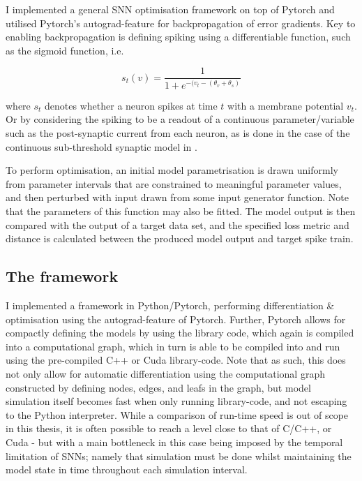 \documentclass[mphil,deptreport,ianc]{infthesis} %
\begin{document}
I implemented a general SNN optimisation framework on top of Pytorch \cite{Paszke2017} and utilised Pytorch's autograd-feature for backpropagation of error gradients.
Key to enabling backpropagation is defining spiking using a differentiable function, such as the sigmoid function, i.e.

\begin{equation}
    s_t(v) = \frac{1}{1+e^{-(v_t-(\theta_v + \theta_s)}}
\end{equation}

where $s_t$ denotes whether a neuron spikes at time $t$ with a membrane potential $v_t$. Or by considering the spiking to be a readout of a continuous parameter/variable such as the post-synaptic current from each neuron, as is done in the case of the continuous sub-threshold synaptic model in \cite{Huh2017}.

To perform optimisation, an initial model parametrisation is drawn uniformly from parameter intervals that are constrained to meaningful parameter values, and then perturbed with input drawn from some input generator function. Note that the parameters of this function may also be fitted.
The model output is then compared with the output of a target data set, and the specified loss metric and distance is calculated between the produced model output and target spike train.

\subsection{The framework}

I implemented a framework in Python/Pytorch, performing differentiation \& optimisation using the autograd-feature of Pytorch.
Further, Pytorch allows for compactly defining the models by using the library code, which again is compiled into a computational graph, which in turn is able to be compiled into and run using the pre-compiled C++ or Cuda library-code.
Note that as such, this does not only allow for automatic differentiation using the computational graph constructed by defining nodes, edges, and leafs in the graph, but model simulation itself becomes fast when only running library-code, and not escaping to the Python interpreter.
While a comparison of run-time speed is out of scope in this thesis, it is often possible to reach a level close to that of C/C++, or Cuda - but with a main bottleneck in this case being imposed by the temporal limitation of SNNs; namely that simulation must be done whilst maintaining the model state in time throughout each simulation interval.
\end{document}
